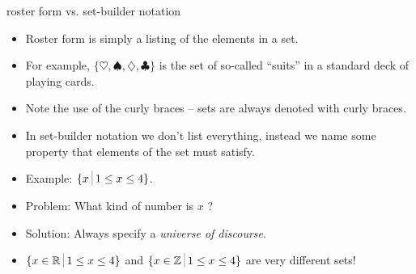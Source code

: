 \documentclass[landscape]{beamer}
\begin{document}
\begin{frame}{roster form vs. set-builder notation}
\begin{itemize}
\item Roster form is simply a listing of the elements in a set. \pause
\item For example, $\{ \heartsuit, \spadesuit, \diamondsuit, \clubsuit \}$ is the set of so-called ``suits'' in a standard deck of playing cards. \pause
\item Note the use of the curly braces -- sets are always denoted with curly braces.\pause
\item In set-builder notation we don't list everything, instead we name some property that elements of the set must satisfy. \pause
\item Example: $\{ x \suchthat 1 \leq x \leq 4 \}$.\pause
\item Problem: What kind of number is $x$ ? \pause
\item Solution: Always specify a {\em universe of discourse}. \pause
\item $\{ x \in \Reals \suchthat 1 \leq x \leq 4 \}$ and $\{ x \in \Integers \suchthat 1 \leq x \leq 4 \}$ are very different sets!
\end{itemize}
\end{frame}
\end{document}
